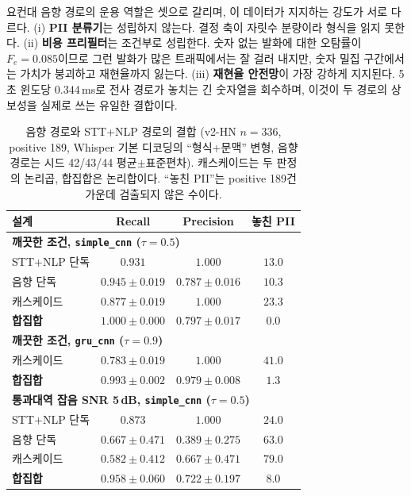\documentclass[10pt,twocolumn]{article}
\renewcommand{\emph}[1]{\textbf{#1}}
\begin{document}
요컨대 음향 경로의 운용 역할은 셋으로 갈리며, 이 데이터가 지지하는 강도가 서로 다르다.
(i) \emph{PII 분류기}는 성립하지 않는다. 결정 축이 자릿수 분량이라 형식을 읽지 못한다.
(ii) \emph{비용 프리필터}는 조건부로 성립한다. 숫자 없는 발화에 대한 오탐률이 $F_e=0.085$이므로
그런 발화가 많은 트래픽에서는 잘 걸러 내지만, 숫자 밀집 구간에서는 가치가 붕괴하고 재현율까지
잃는다. (iii) \emph{재현율 안전망}이 가장 강하게 지지된다. 5초 윈도당 $0.344$\,ms로 전사 경로가
놓치는 긴 숫자열을 회수하며, 이것이 두 경로의 상보성을 실제로 쓰는 유일한 결합이다.

\begin{table}[!t]
\centering
\caption{음향 경로와 STT+NLP 경로의 결합 (v2-HN $n=336$, positive 189, Whisper 기본 디코딩의
``형식+문맥'' 변형, 음향 경로는 시드 42/43/44 평균$\pm$표준편차). 캐스케이드는 두 판정의 논리곱,
합집합은 논리합이다. ``놓친 PII''는 positive 189건 가운데 검출되지 않은 수이다.}
\label{tab:combine}
\footnotesize
\setlength{\tabcolsep}{4pt}
\begin{tabular}{lccc}
\toprule
설계 & Recall & Precision & 놓친 PII \\
\midrule
\multicolumn{4}{l}{\emph{깨끗한 조건, \texttt{simple\_cnn} ($\tau=0.5$)}} \\
STT+NLP 단독 & $0.931$ & $\mathbf{1.000}$ & $13.0$ \\
음향 단독 & $0.945\pm0.019$ & $0.787\pm0.016$ & $10.3$ \\
캐스케이드 & $0.877\pm0.019$ & $\mathbf{1.000}$ & $23.3$ \\
\textbf{합집합} & $\mathbf{1.000\pm0.000}$ & $0.797\pm0.017$ & $\mathbf{0.0}$ \\
\midrule
\multicolumn{4}{l}{\emph{깨끗한 조건, \texttt{gru\_cnn} ($\tau=0.9$)}} \\
캐스케이드 & $0.783\pm0.019$ & $\mathbf{1.000}$ & $41.0$ \\
\textbf{합집합} & $\mathbf{0.993\pm0.002}$ & $0.979\pm0.008$ & $\mathbf{1.3}$ \\
\midrule
\multicolumn{4}{l}{\emph{통과대역 잡음 SNR 5\,dB, \texttt{simple\_cnn} ($\tau=0.5$)}} \\
STT+NLP 단독 & $0.873$ & $\mathbf{1.000}$ & $24.0$ \\
음향 단독 & $0.667\pm0.471$ & $0.389\pm0.275$ & $63.0$ \\
캐스케이드 & $0.582\pm0.412$ & $0.667\pm0.471$ & $79.0$ \\
\textbf{합집합} & $\mathbf{0.958\pm0.060}$ & $0.722\pm0.197$ & $\mathbf{8.0}$ \\
\bottomrule
\end{tabular}
\end{table}
\end{document}
